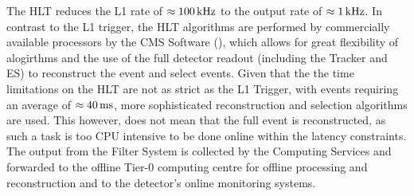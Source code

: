 The HLT reduces the L1 rate of $\approx 100\text{\,kHz}$ to the output rate of $\approx 1\text{\,kHz}$.
In contrast to the L1 trigger, the HLT algorithms are performed by commercially available processors by the CMS Software (\CMSSW), which allows for great flexibility of alogirthms and the use of the full detector readout (including the Tracker and ES) to reconstruct the event and select events.
Given that the the time limitations on the HLT are not as strict as the L1 Trigger, with events requiring an average of $\approx 40\text{\,ms}$, more sophisticated reconstruction and selection algorithms are used.
This however, does not mean that the full event is reconstructed, as such a task is too CPU intensive to be done online within the latency constraints.
The output from the Filter System is collected by the Computing Services and forwarded to the offline Tier-0 computing centre for offline processing and reconstruction and to the detector's online monitoring systems.
